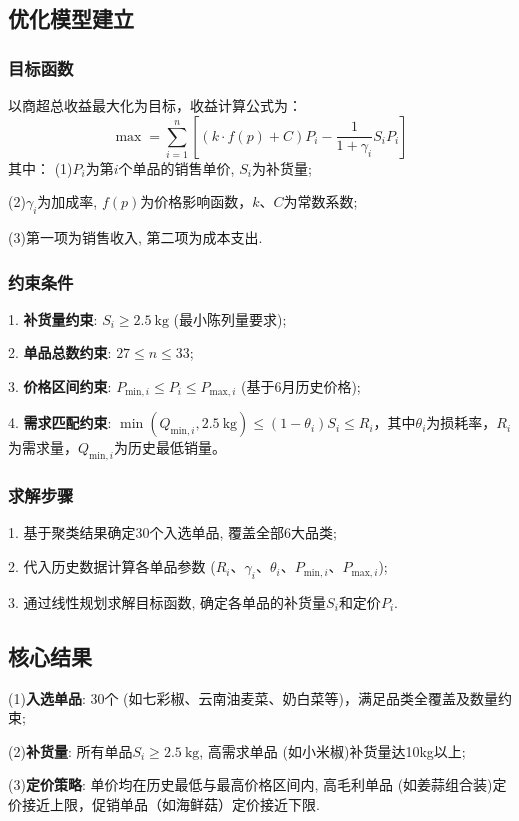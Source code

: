 \documentclass{cumcmthesis}
\begin{document}
\subsection{优化模型建立}
\subsubsection{目标函数}
以商超总收益最大化为目标，收益计算公式为：  
\[
\max = \sum_{i=1}^{n} \left[ \left( k \cdot f(p) + C \right) P_i - \frac{1}{1+\gamma_i} S_i P_i \right]
\]
其中：  
(1)$P_i$为第$i$个单品的销售单价, $S_i$为补货量; 

(2)$\gamma_i$为加成率, $f(p)$为价格影响函数，$k、C$为常数系数;

(3)第一项为销售收入, 第二项为成本支出. 
\subsubsection{约束条件}
1. \textbf{补货量约束}: $S_i \geq 2.5\ \text{kg}$ (最小陈列量要求);  

2. \textbf{单品总数约束}: $27 \leq n \leq 33$;  

3. \textbf{价格区间约束}: $P_{\text{min},i} \leq P_i \leq P_{\text{max},i}$ (基于6月历史价格);   

4. \textbf{需求匹配约束}: $\min(Q_{\text{min},i}, 2.5\ \text{kg}) \leq (1-\theta_i) S_i \leq R_i$，其中$\theta_i$为损耗率，$R_i$为需求量，$Q_{\text{min},i}$为历史最低销量。
\subsubsection{求解步骤}
1. 基于聚类结果确定30个入选单品, 覆盖全部6大品类; 

2. 代入历史数据计算各单品参数 ($R_i、\gamma_i、\theta_i、P_{\text{min},i}、P_{\text{max},i}$); 

3. 通过线性规划求解目标函数, 确定各单品的补货量$S_i$和定价$P_i$. 

\subsection{核心结果}
(1)\textbf{入选单品}: 30个 (如七彩椒、云南油麦菜、奶白菜等)，满足品类全覆盖及数量约束; 

(2)\textbf{补货量}: 所有单品$S_i \geq 2.5\ \text{kg}$, 高需求单品 (如小米椒)补货量达10kg以上;  

(3)\textbf{定价策略}: 单价均在历史最低与最高价格区间内, 高毛利单品 (如姜蒜组合装)定价接近上限，促销单品（如海鲜菇）定价接近下限. 
\end{document}

